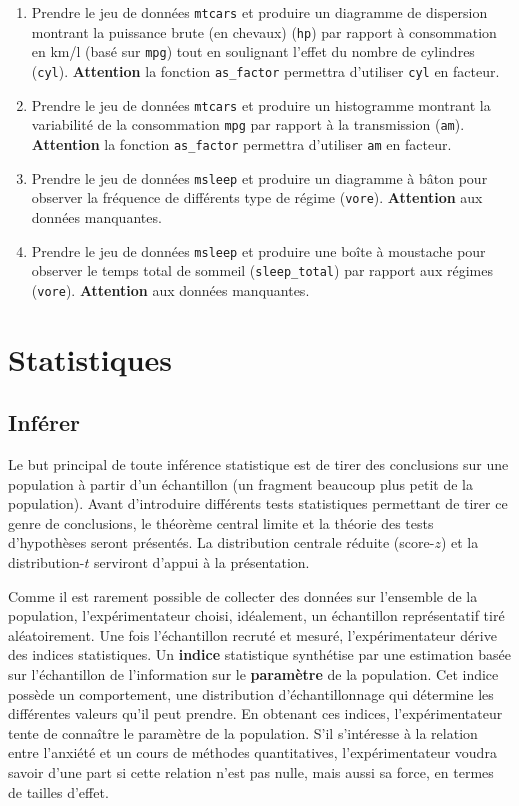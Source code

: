 \documentclass[
]{book}
\begin{document}
\begin{enumerate}
\def\labelenumi{\arabic{enumi}.}
\item
  Prendre le jeu de données \texttt{mtcars} et produire un diagramme de dispersion montrant la puissance brute (en chevaux) (\texttt{hp}) par rapport à consommation en km/l (basé sur \texttt{mpg}) tout en soulignant l'effet du nombre de cylindres (\texttt{cyl}). \textbf{Attention} la fonction \texttt{as\_factor} permettra d'utiliser \texttt{cyl} en facteur.
\item
  Prendre le jeu de données \texttt{mtcars} et produire un histogramme montrant la variabilité de la consommation \texttt{mpg} par rapport à la transmission (\texttt{am}). \textbf{Attention} la fonction \texttt{as\_factor} permettra d'utiliser \texttt{am} en facteur.
\item
  Prendre le jeu de données \texttt{msleep} et produire un diagramme à bâton pour observer la fréquence de différents type de régime (\texttt{vore}). \textbf{Attention} aux données manquantes.
\item
  Prendre le jeu de données \texttt{msleep} et produire une boîte à moustache pour observer le temps total de sommeil (\texttt{sleep\_total}) par rapport aux régimes (\texttt{vore}). \textbf{Attention} aux données manquantes.
\end{enumerate}

\hypertarget{part-statistiques}{%
\part{Statistiques}\label{part-statistiques}}

\hypertarget{infuxe9rer}{%
\chapter{Inférer}\label{infuxe9rer}}

Le but principal de toute inférence statistique est de tirer des conclusions sur une population à partir d'un échantillon (un fragment beaucoup plus petit de la population). Avant d'introduire différents tests statistiques permettant de tirer ce genre de conclusions, le théorème central limite et la théorie des tests d'hypothèses seront présentés. La distribution centrale réduite (score-\(z\)) et la distribution-\(t\) serviront d'appui à la présentation.

Comme il est rarement possible de collecter des données sur l'ensemble de la population, l'expérimentateur choisi, idéalement, un échantillon représentatif tiré aléatoirement. Une fois l'échantillon recruté et mesuré, l'expérimentateur dérive des indices statistiques. Un \textbf{indice} statistique synthétise par une estimation basée sur l'échantillon de l'information sur le \textbf{paramètre} de la population. Cet indice possède un comportement, une distribution d'échantillonnage qui détermine les différentes valeurs qu'il peut prendre. En obtenant ces indices, l'expérimentateur tente de connaître le paramètre de la population. S'il s'intéresse à la relation entre l'anxiété et un cours de méthodes quantitatives, l'expérimentateur voudra savoir d'une part si cette relation n'est pas nulle, mais aussi sa force, en termes de tailles d'effet.
\end{document}
